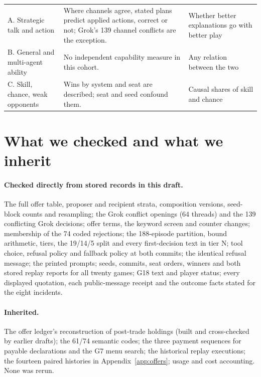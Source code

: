 \begin{longtable}{@{}L{.2\linewidth}L{.42\linewidth}L{.3\linewidth}@{}}
A. Strategic talk and action & Where channels agree, stated plans predict applied actions, correct or not; Grok's 139 channel conflicts are the exception. & Whether better explanations go with better play\\
B. General and multi-agent ability & No independent capability measure in this cohort. & Any relation between the two\\
C. Skill, chance, weak opponents & Wins by system and seat are described; seat and seed confound them. & Causal shares of skill and chance\\
\bottomrule\end{longtable}
\normalsize

\FloatBarrier
\section{What we checked and what we inherit}
\label{app:checks}
\paragraph{Checked directly from stored records in this draft.} The full offer table, proposer and recipient strata, composition versions, seed-block counts and resampling; the Grok conflict openings (64 threads) and the 139 conflicting Grok decisions; offer terms, the keyword screen and counter changes; membership of the 74 coded rejections; the 188-episode partition, bound arithmetic, tiers, the 19/14/5 split and every first-decision text in tier N; tool choice, refusal policy and fallback policy at both commits; the identical refusal message; the printed prompts; seeds, commits, seat orders, winners and both stored replay reports for all twenty games; G18 text and player status; every displayed quotation, each public-message receipt and the outcome facts stated for the eight incidents.

\paragraph{Inherited.} The offer ledger's reconstruction of post-trade holdings (built and cross-checked by earlier drafts); the 61/74 semantic codes; the three payment sequences for payable declarations and the G7 menu search; the historical replay executions; the fourteen paired histories in Appendix~\ref{app:offers}; usage and cost accounting. None was rerun.

\FloatBarrier
